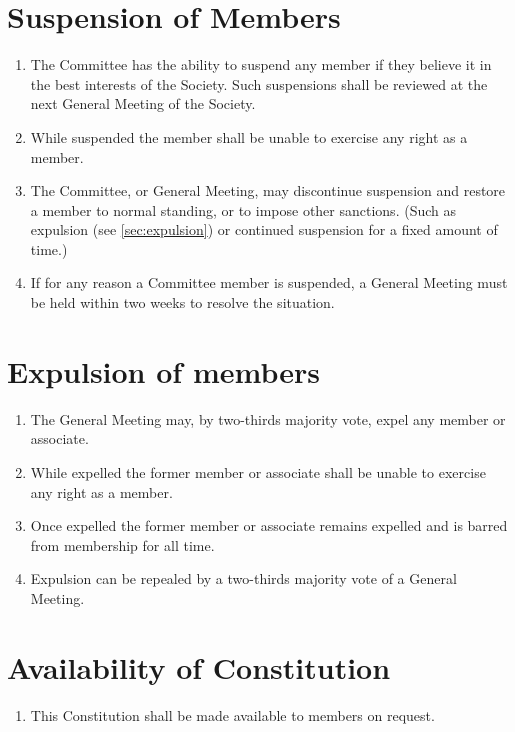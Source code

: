 \documentclass[a4paper]{article}
\begin{document}
\section{Suspension of Members} \label{sec:member_suspension}
\begin{enumerate}
    \item The Committee has the ability to suspend any member if they believe it in the best interests of the Society. Such suspensions shall be reviewed at the next General Meeting of the Society.
    \item While suspended the member shall be unable to exercise any right as a member. 
    \item The Committee, or General Meeting, may discontinue suspension and restore a member to normal standing, or to impose other sanctions. (Such as expulsion (see \cref{sec:expulsion}) or continued suspension for a fixed amount of time.)
    \item \label{committee_suspended} If for any reason a Committee member is suspended, a General Meeting must be held within two weeks to resolve the situation.
\end{enumerate}


\section{Expulsion of members\label{sec:expulsion}}
\begin{enumerate}
    \item The General Meeting may, by two-thirds majority vote, expel any member or associate.
    \item While expelled the former member or associate shall be unable to exercise any right as a member. 
    \item Once expelled the former member or associate remains expelled and is barred from membership for all time.
    \item Expulsion can be repealed by a two-thirds majority vote of a General Meeting.
\end{enumerate}


\section{Availability of Constitution}
\begin{enumerate}
	\item This Constitution shall be made available to members on request.
\end{enumerate}
\end{document}
